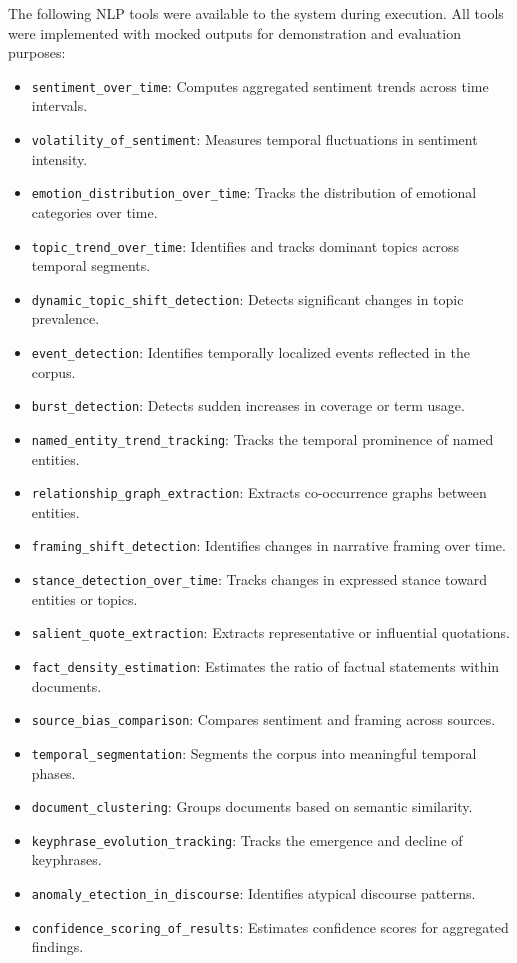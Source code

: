 The following NLP tools were available to the system during execution. All tools were implemented with mocked outputs for demonstration and evaluation purposes:

\begin{itemize}
    \item \texttt{sentiment\_over\_time}: Computes aggregated sentiment trends across time intervals.
    \item \texttt{volatility\_of\_sentiment}: Measures temporal fluctuations in sentiment intensity.
    \item \texttt{emotion\_distribution\_over\_time}: Tracks the distribution of emotional categories over time.
    \item \texttt{topic\_trend\_over\_time}: Identifies and tracks dominant topics across temporal segments.
    \item \texttt{dynamic\_topic\_shift\_detection}: Detects significant changes in topic prevalence.
    \item \texttt{event\_detection}: Identifies temporally localized events reflected in the corpus.
    \item \texttt{burst\_detection}: Detects sudden increases in coverage or term usage.
    \item \texttt{named\_entity\_trend\_tracking}: Tracks the temporal prominence of named entities.
    \item \texttt{relationship\_graph\_extraction}: Extracts co-occurrence graphs between entities.
    \item \texttt{framing\_shift\_detection}: Identifies changes in narrative framing over time.
    \item \texttt{stance\_detection\_over\_time}: Tracks changes in expressed stance toward entities or topics.
    \item \texttt{salient\_quote\_extraction}: Extracts representative or influential quotations.
    \item \texttt{fact\_density\_estimation}: Estimates the ratio of factual statements within documents.
    \item \texttt{source\_bias\_comparison}: Compares sentiment and framing across sources.
    \item \texttt{temporal\_segmentation}: Segments the corpus into meaningful temporal phases.
    \item \texttt{document\_clustering}: Groups documents based on semantic similarity.
    \item \texttt{keyphrase\_evolution\_tracking}: Tracks the emergence and decline of keyphrases.
    \item \texttt{anomaly\_etection\_in\_discourse}: Identifies atypical discourse patterns.
    \item \texttt{confidence\_scoring\_of\_results}: Estimates confidence scores for aggregated findings.
\end{itemize}


